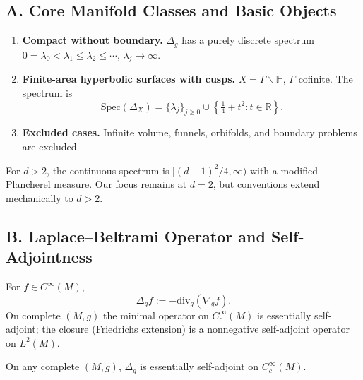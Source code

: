 \subsection*{A. Core Manifold Classes and Basic Objects}
\label{subsec:classes-part1}

\begin{definition}
\label{def:core-classes-part1}
\begin{enumerate}[label=(\roman*)]
  \item \textbf{Compact without boundary.} $\Delta_g$ has a purely discrete spectrum $0=\lambda_0 < \lambda_1 \le \lambda_2 \le \cdots$, $\lambda_j \to \infty$.
  \item \textbf{Finite-area hyperbolic surfaces with cusps.} $X=\Gamma\backslash\mathbb H$, $\Gamma$ cofinite. The spectrum is
  \[
    \mathrm{Spec}(\Delta_X)=\{\lambda_j\}_{j\geq 0} \cup \left\{ \tfrac14+t^2: t\in\mathbb R \right\}.
  \]
  \item \textbf{Excluded cases.} Infinite volume, funnels, orbifolds, and boundary problems are excluded.
\end{enumerate}
\end{definition}

\begin{remark}
\label{rem:higher-dim-part1}
For $d>2$, the continuous spectrum is $[(d-1)^2/4,\infty)$ with a modified Plancherel measure. Our focus remains at $d=2$, but conventions extend mechanically to $d>2$.
\end{remark}


\subsection*{B. Laplace--Beltrami Operator and Self-Adjointness}
\label{subsec:laplacian-part1}

\begin{definition}
\label{def:laplacian-part1}
For $f\in C^\infty(M)$,
\[
  \Delta_g f := -\mathrm{div}_g(\nabla_g f).
\]
On complete $(M,g)$ the minimal operator on $C_c^\infty(M)$ is essentially self-adjoint; the closure (Friedrichs extension) is a nonnegative self-adjoint operator on $L^2(M)$.
\end{definition}

\begin{lemma}
\label{lem:esa-part1}
On any complete $(M,g)$, $\Delta_g$ is essentially self-adjoint on $C_c^\infty(M)$.
\end{lemma}

